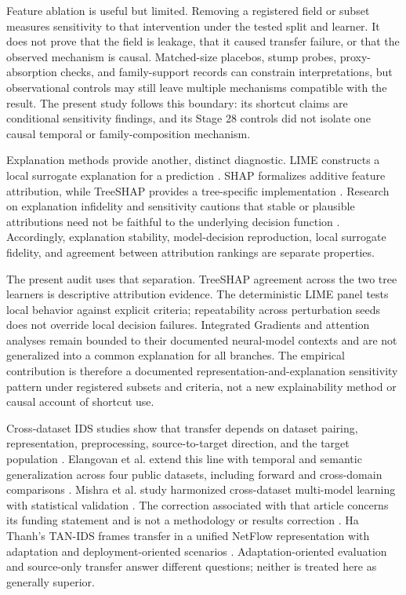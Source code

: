 \documentclass[preprint,12pt]{elsarticle}
\begin{document}
Feature ablation is useful but limited. Removing a registered field or subset measures sensitivity to that intervention under the tested split and learner. It does not prove that the field is leakage, that it caused transfer failure, or that the observed mechanism is causal. Matched-size placebos, stump probes, proxy-absorption checks, and family-support records can constrain interpretations, but observational controls may still leave multiple mechanisms compatible with the result. The present study follows this boundary: its shortcut claims are conditional sensitivity findings, and its Stage 28 controls did not isolate one causal temporal or family-composition mechanism.

Explanation methods provide another, distinct diagnostic. LIME constructs a local surrogate explanation for a prediction \cite{ribeiro2016lime}. SHAP formalizes additive feature attribution, while TreeSHAP provides a tree-specific implementation \cite{lundberg2017shap,lundberg2020trees}. Research on explanation infidelity and sensitivity cautions that stable or plausible attributions need not be faithful to the underlying decision function \cite{yeh2019infidelity}. Accordingly, explanation stability, model-decision reproduction, local surrogate fidelity, and agreement between attribution rankings are separate properties.

The present audit uses that separation. TreeSHAP agreement across the two tree learners is descriptive attribution evidence. The deterministic LIME panel tests local behavior against explicit criteria; repeatability across perturbation seeds does not override local decision failures. Integrated Gradients and attention analyses remain bounded to their documented neural-model contexts and are not generalized into a common explanation for all branches. The empirical contribution is therefore a documented representation-and-explanation sensitivity pattern under registered subsets and criteria, not a new explainability method or causal account of shortcut use.

Cross-dataset IDS studies show that transfer depends on dataset pairing, representation, preprocessing, source-to-target direction, and the target population \cite{dhooge2020interdataset,layeghy2023crossdomain,cantone2024crossdataset}. Elangovan et al. extend this line with temporal and semantic generalization across four public datasets, including forward and cross-domain comparisons \cite{elangovan2026crossdataset}. Mishra et al. study harmonized cross-dataset multi-model learning with statistical validation \cite{mishra2026harmonized}. The correction associated with that article concerns its funding statement and is not a methodology or results correction \cite{mishra2026correction}. Ha Thanh's TAN-IDS frames transfer in a unified NetFlow representation with adaptation and deployment-oriented scenarios \cite{hathanh2026tanids}. Adaptation-oriented evaluation and source-only transfer answer different questions; neither is treated here as generally superior.
\end{document}
